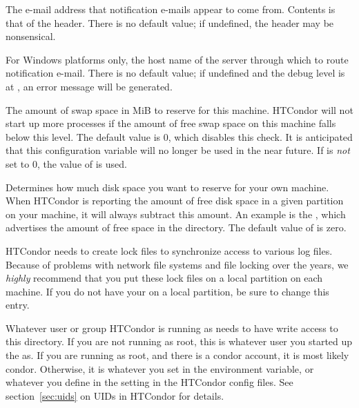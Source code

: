 \begin{description}
\label{param:MailFrom}
\item[\Macro{MAIL\_FROM}]
  The e-mail address that notification e-mails appear to come from.
  Contents is that of the  header.
  There is no default value; if undefined, the  header may
  be nonsensical.

\label{param:SMTPServer}
\item[\Macro{SMTP\_SERVER}]
  For Windows platforms only, the host name of the server through which
  to route notification e-mail.
  There is no default value; if undefined and the debug level is
  at  , an error message will be generated.

\label{param:ReservedSwap}
\item[\Macro{RESERVED\_SWAP}]
  The amount of swap space in MiB to reserve for this machine.
  HTCondor will not start up more  processes if the
  amount of free swap space on this machine falls below this level.
  The default value is 0, which disables this check.
  It is anticipated that this configuration variable will no longer
  be used in the near future.
  If  is \emph{not} set to 0,
  the value of  is used.

\label{param:ReservedDisk}
\item[\Macro{RESERVED\_DISK}]
  Determines how much disk space you want to reserve for your own machine.
  When HTCondor is reporting the amount of free disk space in a given
  partition on your machine, it will always subtract this amount.  An
  example is the , which advertises the amount of free
  space in the  directory.  The default value of
   is zero.
  
\label{param:Lock}
\item[\Macro{LOCK}]
  HTCondor needs to create
  lock files to synchronize access to various log files.  Because of
  problems with network file systems and file locking over
  the years, we \emph{highly} recommend that you put these lock
  files on a local partition on each machine.  If you do not have your
   on a local partition, be sure to change this
  entry.

  Whatever user or group HTCondor is running as needs to have
  write access to this directory.  If you are not running as root, this
  is whatever user you started up the  as.  If you are
  running as root, and there is a condor account, it is most
  likely condor.
  Otherwise, it is whatever you set in the 
  environment variable, or whatever you define in the
   setting in the HTCondor config files.
  See section~\ref{sec:uids} on UIDs in HTCondor for details.


\end{description}
